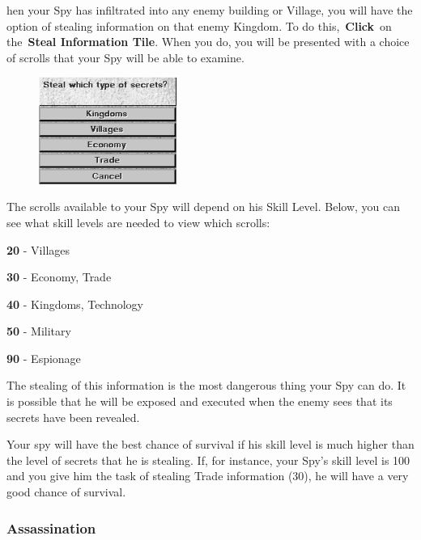 hen your Spy has infiltrated into any enemy building or Village, you will have the option of stealing information on that enemy Kingdom. To do this, \textbf{Click} on the \textbf{Steal Information Tile}. When you do, you will be presented with a choice of scrolls that your Spy will be able to examine.

\begin{figure}
	\vspace{-20pt}
	\begin{center}
		\includegraphics[width=0.4\textwidth]{Isecrets}
	\end{center}
	\vspace{-20pt}
\end{figure}

The scrolls available to your Spy will depend on his Skill Level. Below, you can see what skill levels are needed to view which scrolls:

\begin{changemargin}{.5cm}{0cm}
\textbf{20} - Villages

\textbf{30} - Economy, Trade

\textbf{40} - Kingdoms, Technology

\textbf{50} - Military

\textbf{90} - Espionage \\ %
\end{changemargin}

The stealing of this information is the most dangerous thing your Spy can do. It is possible that he will be exposed and executed when the enemy sees that its secrets have been revealed.

Your spy will have the best chance of survival if his skill level is much higher than the level of secrets that he is stealing. If, for instance, your Spy’s skill level is 100 and you give him the task of stealing Trade information (30), he will have a very good chance of survival.

\subsubsection{Assassination}

